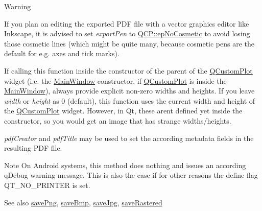 \begin{DoxyWarning}{Warning}
\begin{DoxyItemize}
\item If you plan on editing the exported P\+DF file with a vector graphics editor like Inkscape, it is advised to set {\itshape export\+Pen} to \hyperlink{namespaceQCP_a17844f19e1019693a953e1eb93536d2faae8fcfaafee234ce18558afef83f6a78}{Q\+C\+P\+::ep\+No\+Cosmetic} to avoid losing those cosmetic lines (which might be quite many, because cosmetic pens are the default for e.\+g. axes and tick marks). \item If calling this function inside the constructor of the parent of the \hyperlink{classQCustomPlot}{Q\+Custom\+Plot} widget (i.\+e. the \hyperlink{classMainWindow}{Main\+Window} constructor, if \hyperlink{classQCustomPlot}{Q\+Custom\+Plot} is inside the \hyperlink{classMainWindow}{Main\+Window}), always provide explicit non-\/zero widths and heights. If you leave {\itshape width} or {\itshape height} as 0 (default), this function uses the current width and height of the \hyperlink{classQCustomPlot}{Q\+Custom\+Plot} widget. However, in Qt, these aren\textquotesingle{}t defined yet inside the constructor, so you would get an image that has strange widths/heights.\end{DoxyItemize}
{\itshape pdf\+Creator} and {\itshape pdf\+Title} may be used to set the according metadata fields in the resulting P\+DF file.
\end{DoxyWarning}
\begin{DoxyNote}{Note}
On Android systems, this method does nothing and issues an according q\+Debug warning message. This is also the case if for other reasons the define flag {\ttfamily Q\+T\+\_\+\+N\+O\+\_\+\+P\+R\+I\+N\+T\+ER} is set.
\end{DoxyNote}
\begin{DoxySeeAlso}{See also}
\hyperlink{classQCustomPlot_ac92cc9256d12f354b40a4be4600b5fb9}{save\+Png}, \hyperlink{classQCustomPlot_ae3a86ed0795670e50afa21759d4fa13d}{save\+Bmp}, \hyperlink{classQCustomPlot_a76f0d278e630a711fa6f48048cfd83e4}{save\+Jpg}, \hyperlink{classQCustomPlot_ad7723ce2edfa270632ef42b03a444352}{save\+Rastered} 
\end{DoxySeeAlso}
\mbox{\label{classQCustomPlot_ac92cc9256d12f354b40a4be4600b5fb9}} 
